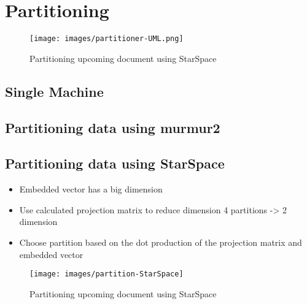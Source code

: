 \section{Partitioning}
\label{sec:partitioning}

\begin{figure}[!h]
	\centering
	\texttt{[image: images/partitioner-UML.png]}
	\caption{Partitioning upcoming document using StarSpace}
	\label{fig:partitioner-uml}
\end{figure}

\subsection{Single Machine}
\label{subsec:partitioning-single-machine}


\subsection{Partitioning data using murmur2}
\label{subsec:partitioning-murmur2}


\subsection{Partitioning data using StarSpace}
\label{subsec:partitioning-star-space}

\begin{itemize}
    \item Embedded vector has a big dimension

    \item Use calculated projection matrix to reduce dimension
    4 partitions -> 2 dimension
    
    \item Choose partition based on the dot production of the projection matrix and embedded vector
    
\end{itemize}




\begin{figure}[!h]
	\centering
	\texttt{[image: images/partition-StarSpace]}
	\caption{Partitioning upcoming document using StarSpace}
	\label{fig:star-space-partitioning}
\end{figure}
